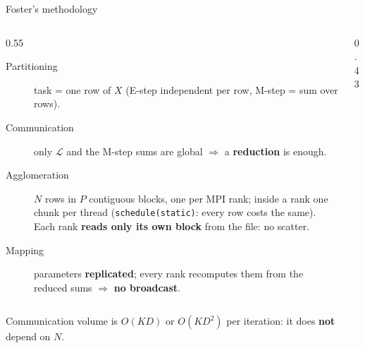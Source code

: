 \documentclass[aspectratio=169,10pt]{beamer}
\newcommand{\takeaway}[1]{\begin{center}\colorbox{accent!10}{\parbox{0.92\textwidth}{\centering\small #1}}\end{center}}
\begin{document}
\begin{frame}{Foster's methodology}
\begin{columns}[T]
\begin{column}{0.55\textwidth}
\footnotesize
\begin{description}
\item[Partitioning] task = one row of $X$ (E-step independent per row, M-step = sum over rows).
\item[Communication] only $\mathcal{L}$ and the M-step sums are global $\Rightarrow$ a \textbf{reduction} is enough.
\item[Agglomeration] $N$ rows in $P$ contiguous blocks, one per MPI rank; inside a rank one chunk per thread (\texttt{schedule(static)}: every row costs the same). Each rank \textbf{reads only its own block} from the file: no scatter.
\item[Mapping] parameters \textbf{replicated}; every rank recomputes them from the reduced sums $\Rightarrow$ \textbf{no broadcast}.
\end{description}
\end{column}
\begin{column}{0.43\textwidth}
\centering
{}
\end{column}
\end{columns}
\takeaway{Communication volume is $O(KD)$ or $O(KD^2)$ per iteration: it does \textbf{not} depend on $N$.}
\end{frame}
\end{document}
